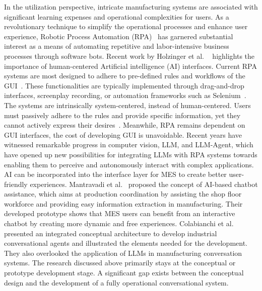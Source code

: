 \documentclass[preprint,12pt]{elsarticle}
\begin{document}
In the utilization perspective, intricate manufacturing systems are associated with significant learning expenses and operational complexities for users.
As a revolutionary technique to simplify the operational processes and enhance user experience, Robotic Process Automation (RPA)~\cite{siderska2020robotic} has garnered substantial interest as a means of automating repetitive and labor-intensive business processes through software bots.
Recent work by Holzinger et al. ~\cite{holzinger2022personas} highlights the importance of human-centered Artificial intelligence (AI) interfaces.
Current RPA systems are most designed to adhere to pre-defined rules and workflows of the GUI~\cite{jain2024smartflow}.
These functionalities are typically implemented through drag-and-drop interfaces, screenplay recording, or automation frameworks such as Selenium~\cite{sharma2014web}.
The systems are intrinsically system-centered, instead of human-centered.
Users must passively adhere to the rules and provide specific information, yet they cannot actively express their desires~\cite{jain2024smartflow}.
Meanwhile, RPA remains dependent on GUI interfaces, the cost of developing GUI is unavoidable.
Recent years have witnessed remarkable progress in computer vision, LLM, and LLM-Agent, which have opened up new possibilities for integrating LLMs with RPA systems towards enabling them to perceive and autonomously interact with complex applications.
AI can be incorporated into the interface layer for MES to create better user-friendly experiences. 
Mantravadi et al.~\cite{mantravadi2020user} proposed the concept of AI-based chatbot assistance, which aims at production coordination by assisting the shop floor workforce and providing easy information
extraction in manufacturing.
Their developed prototype shows that MES users can benefit from an interactive chatbot by creating more dynamic and free experiences.
Colabianchi et al.~\cite{colabianchi2023human} presented an integrated conceptual architecture to develop industrial conversational agents and illustrated the elements needed for the development. 
They also overlooked the application of LLMs in manufacturing conversation systems.
The research discussed above primarily stays at the conceptual or prototype development stage. 
A significant gap exists between the conceptual design and the development of a fully operational conversational system.
\end{document}
